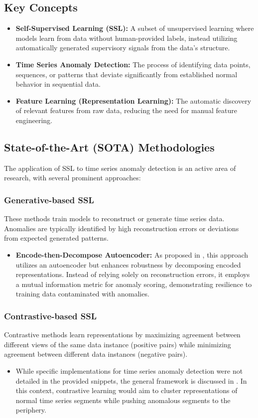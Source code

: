 \documentclass{article}
\begin{document}
\subsection{Key Concepts}
\begin{itemize}
    \item \textbf{Self-Supervised Learning (SSL):} A subset of unsupervised learning where models learn from data without human-provided labels, instead utilizing automatically generated supervisory signals from the data's structure.
    \item \textbf{Time Series Anomaly Detection:} The process of identifying data points, sequences, or patterns that deviate significantly from established normal behavior in sequential data.
    \item \textbf{Feature Learning (Representation Learning):} The automatic discovery of relevant features from raw data, reducing the need for manual feature engineering.
\end{itemize}

\subsection{State-of-the-Art (SOTA) Methodologies}
The application of SSL to time series anomaly detection is an active area of research, with several prominent approaches:

\subsubsection{Generative-based SSL}
These methods train models to reconstruct or generate time series data. Anomalies are typically identified by high reconstruction errors or deviations from expected generated patterns.
\begin{itemize}
    \item \textbf{Encode-then-Decompose Autoencoder:} As proposed in \cite{encode_decompose}, this approach utilizes an autoencoder but enhances robustness by decomposing encoded representations. Instead of relying solely on reconstruction errors, it employs a mutual information metric for anomaly scoring, demonstrating resilience to training data contaminated with anomalies.
\end{itemize}

\subsubsection{Contrastive-based SSL}
Contrastive methods learn representations by maximizing agreement between different views of the same data instance (positive pairs) while minimizing agreement between different data instances (negative pairs).
\begin{itemize}
    \item While specific implementations for time series anomaly detection were not detailed in the provided snippets, the general framework is discussed in \cite{survey_paper}. In this context, contrastive learning would aim to cluster representations of normal time series segments while pushing anomalous segments to the periphery.
\end{itemize}
\end{document}
